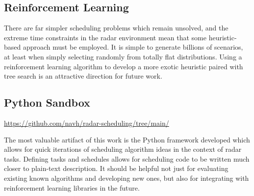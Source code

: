 \documentclass[journal,12pt,onecolumn,draftclsnofoot,]{IEEEtran}
\begin{document}
\subsection{Reinforcement Learning}

There are far simpler scheduling problems which remain unsolved, and the extreme time constraints in the radar environment mean that some heuristic-based approach must be employed.
It is simple to generate billions of scenarios, at least when simply selecting randomly from totally flat distributions.
Using a reinforcement learning algorithm to develop a more exotic heuristic paired with tree search is an attractive direction for future work.

\subsection{Python Sandbox}

\href{https://github.com/navh/radar-scheduling/tree/main/}{https://github.com/navh/radar-scheduling/tree/main/}

The most valuable artifact of this work is the Python framework developed which allows for quick iterations of scheduling algorithm ideas in the context of radar tasks.
Defining tasks and schedules allows for scheduling code to be written much closer to plain-text description.
It should be helpful not just for evaluating existing known algorithms and developing new ones, but also for integrating with reinforcement learning libraries in the future.





\end{document}
